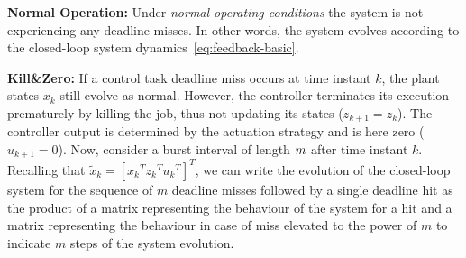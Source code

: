 
\textbf{Normal Operation: }%
Under \emph{normal operating conditions} the system is not
experiencing any deadline misses. In other words, the system
evolves according to the closed-loop system
dynamics~\eqref{eq:feedback-basic}.

\textbf{Kill\&Zero: }%
%
If a control task deadline miss occurs at time instant $k$, the
plant states $x_k$ still evolve as normal. However, the controller
terminates its execution prematurely by killing the job, thus not
updating its states ($z_{k+1} = z_k$). The controller
output is determined by the actuation strategy and is here
zero ($u_{k+1} = 0$). Now, consider a burst
interval of length $m$ after time instant $k$. Recalling
that $\tilde{x}_k = \left[ {x_k}^T {z_k}^T {u_k}^T \right]^T$, we
can write the evolution of the closed-loop system for the
sequence of $m$ deadline misses followed by a single deadline hit
as the product of a matrix representing the behaviour of the
system for a hit and a matrix representing the behaviour in case
of miss elevated to the power of $m$ to indicate $m$ steps of the
system evolution.

